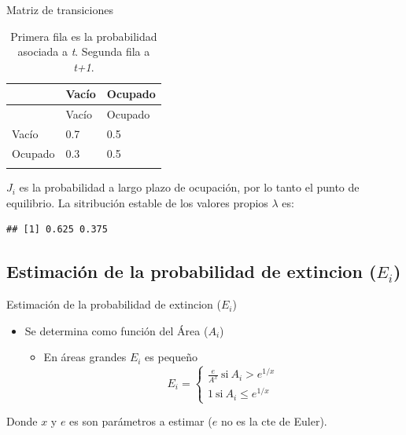 \documentclass[
  11pt,
  ignorenonframetext,
]{beamer}
\providecommand{\tightlist}{%
  \setlength{\itemsep}{0pt}\setlength{\parskip}{0pt}}
\begin{document}
\begin{frame}[fragile]{Matriz de transiciones}
\begin{longtable}[]{@{}lll@{}}
\caption{Primera fila es la probabilidad asociada a \emph{t}. Segunda
fila a \emph{t+1}.}\tabularnewline
\toprule\noalign{}
& Vacío & Ocupado \\
\midrule\noalign{}
\endfirsthead
\toprule\noalign{}
& Vacío & Ocupado \\
\midrule\noalign{}
\endhead
Vacío & 0.7 & 0.5 \\
Ocupado & 0.3 & 0.5 \\
\bottomrule\noalign{}
\end{longtable}

\(J_i\) es la probabilidad a largo plazo de ocupación, por lo tanto el
punto de equilibrio. La sitribución estable de los valores propios
\(\lambda\) es:

\begin{verbatim}
## [1] 0.625 0.375
\end{verbatim}
\end{frame}

\hypertarget{estimaciuxf3n-de-la-probabilidad-de-extincion-e_i}{%
\subsection{\texorpdfstring{Estimación de la probabilidad de extincion
(\(E_i\))}{Estimación de la probabilidad de extincion (E\_i)}}\label{estimaciuxf3n-de-la-probabilidad-de-extincion-e_i}}

\begin{frame}{Estimación de la probabilidad de extincion (\(E_i\))}
\begin{itemize}
\item
  Se determina como función del Área (\(A_i\))

  \begin{itemize}
  \tightlist
  \item
    En áreas grandes \(E_i\) es pequeño \begin{equation}
    E_i = \left\{ \begin{aligned}
    \frac{e}{A^x} \mathrm{\ si\ } A_i > e^{1/x}\\
    1 \mathrm{\ si\ } A_i \leq e^{1/x}
    \end{aligned} \right.
    \end{equation}
  \end{itemize}
\end{itemize}

Donde \(x\) y \(e\) es son parámetros a estimar (\(e\) no es la cte de
Euler).
\end{frame}
\end{document}
